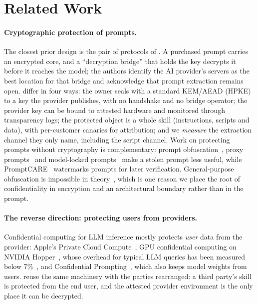 \section{Related Work}
\label{sec:related}

\paragraph{Cryptographic protection of prompts.}
The closest prior design is the pair of protocols of \citet{vanwyk2023protect}. A purchased prompt
carries an encrypted core, and a ``decryption bridge'' that holds the key decrypts it before it
reaches the model; the authors identify the AI provider's servers as the best location for that
bridge and acknowledge that prompt extraction remains open. \sys{} differ in four ways: the owner
seals with a standard KEM/AEAD (HPKE) to a key the provider publishes, with no handshake and no
bridge operator; the provider key can be bound to attested hardware and monitored through
transparency logs; the protected object is a whole skill (instructions, scripts and data), with
per-customer canaries for attribution; and we \emph{measure} the extraction channel they only name,
including the script channel. Work on protecting prompts without cryptography is complementary:
prompt obfuscation~\citep{pape2025prompt}, proxy prompts~\citep{zhuang2025proxyprompt} and
model-locked prompts~\citep{li2026praglocker} make a stolen prompt less useful, while
PromptCARE~\citep{yao2024promptcare} watermarks prompts for later verification. General-purpose
obfuscation is impossible in theory~\citep{barak2012impossibility}, which is one reason we place
the root of confidentiality in encryption and an architectural boundary rather than in the prompt.

\paragraph{The reverse direction: protecting users from providers.}
Confidential computing for LLM inference mostly protects \emph{user} data from the provider:
Apple's Private Cloud Compute~\citep{apple2024pcc}, GPU confidential computing on NVIDIA
Hopper~\citep{nvidia2023hopper,nvidia2026nvtrust}, whose overhead for typical LLM queries has been
measured below 7\%~\citep{zhu2024confidential}, and Confidential Prompting~\citep{li2024confidential},
which also keeps model weights from users. \sys{} reuse the same machinery with the parties
rearranged: a third party's skill is protected from the end user, and the attested provider
environment is the only place it can be decrypted.

